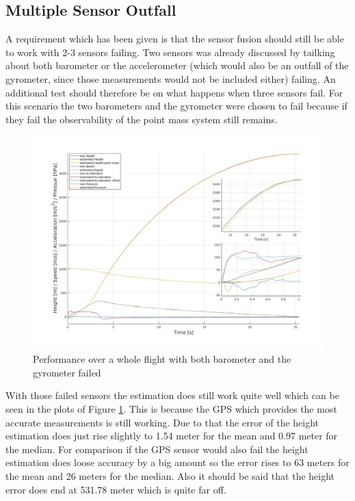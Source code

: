 \newpage
\subsection{Multiple Sensor Outfall}
A requirement which has been given is that the sensor fusion should still be able to work with 2-3 sensors failing.
Two sensors was already discussed by tailking about both barometer or the accelerometer
(which would also be an outfall of the gyrometer, since those measurements would not be included either) failing.
An additional test should therefore be on what happens when three sensors fail.
For this scenario the two barometers and the gyrometer were chosen to fail because if they fail the observability of the point mass system still remains.

\begin{figure}[h!]
 \centering
 \includegraphics[width=.8\textwidth]{./Pictures/BestSystemPerformanceMultSensorOutfall.jpg}
 \caption{Performance over a whole flight with both barometer and the gyrometer failed}
 \label{fig:PerformanceMOutfall}
\end{figure}

With those failed sensors the estimation does still work quite well which can be seen in the plots of Figure \ref{fig:PerformanceMOutfall}.
This is because the GPS which provides the most accurate measurements is still working.
Due to that the error of the height estimation does just rise slightly to 1.54 meter for the mean and 0.97 meter for the median.
For comparison if the GPS sensor would also fail the height estimation does loose accuracy by a big amount so the error rises to 63 meters for the mean and 26 meters for the median.
Also it should be said that the height error does end at 531.78 meter which is quite far off.
